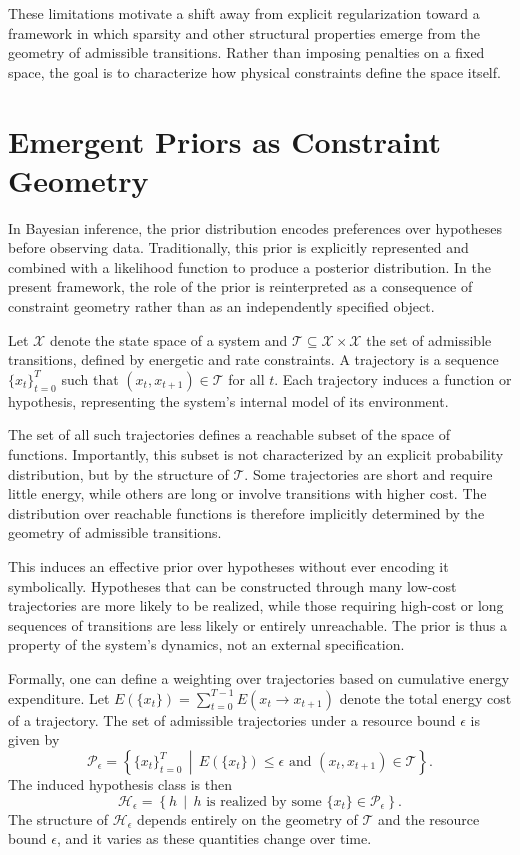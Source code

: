 \documentclass[12pt]{article}
\theoremstyle{plain}
\theoremstyle{definition}
\theoremstyle{remark}
\begin{document}
These limitations motivate a shift away from explicit regularization toward a framework in which sparsity and other structural properties emerge from the geometry of admissible transitions. Rather than imposing penalties on a fixed space, the goal is to characterize how physical constraints define the space itself.

\section{Emergent Priors as Constraint Geometry}

In Bayesian inference, the prior distribution encodes preferences over hypotheses before observing data. Traditionally, this prior is explicitly represented and combined with a likelihood function to produce a posterior distribution. In the present framework, the role of the prior is reinterpreted as a consequence of constraint geometry rather than as an independently specified object.

Let $\mathcal{X}$ denote the state space of a system and $\mathcal{T} \subseteq \mathcal{X} \times \mathcal{X}$ the set of admissible transitions, defined by energetic and rate constraints. A trajectory is a sequence $\{x_t\}_{t=0}^T$ such that $(x_t, x_{t+1}) \in \mathcal{T}$ for all $t$. Each trajectory induces a function or hypothesis, representing the system's internal model of its environment.

The set of all such trajectories defines a reachable subset of the space of functions. Importantly, this subset is not characterized by an explicit probability distribution, but by the structure of $\mathcal{T}$. Some trajectories are short and require little energy, while others are long or involve transitions with higher cost. The distribution over reachable functions is therefore implicitly determined by the geometry of admissible transitions.

This induces an effective prior over hypotheses without ever encoding it symbolically. Hypotheses that can be constructed through many low-cost trajectories are more likely to be realized, while those requiring high-cost or long sequences of transitions are less likely or entirely unreachable. The prior is thus a property of the system's dynamics, not an external specification.

Formally, one can define a weighting over trajectories based on cumulative energy expenditure. Let $E(\{x_t\}) = \sum_{t=0}^{T-1} E(x_t \to x_{t+1})$ denote the total energy cost of a trajectory. The set of admissible trajectories under a resource bound $\epsilon$ is given by
\[
\mathcal{P}_\epsilon = \left\{ \{x_t\}_{t=0}^T \,\middle|\, E(\{x_t\}) \leq \epsilon \text{ and } (x_t, x_{t+1}) \in \mathcal{T} \right\}.
\]
The induced hypothesis class is then
\[
\mathcal{H}_\epsilon = \left\{ h \,\middle|\, h \text{ is realized by some } \{x_t\} \in \mathcal{P}_\epsilon \right\}.
\]
The structure of $\mathcal{H}_\epsilon$ depends entirely on the geometry of $\mathcal{T}$ and the resource bound $\epsilon$, and it varies as these quantities change over time.
\end{document}
